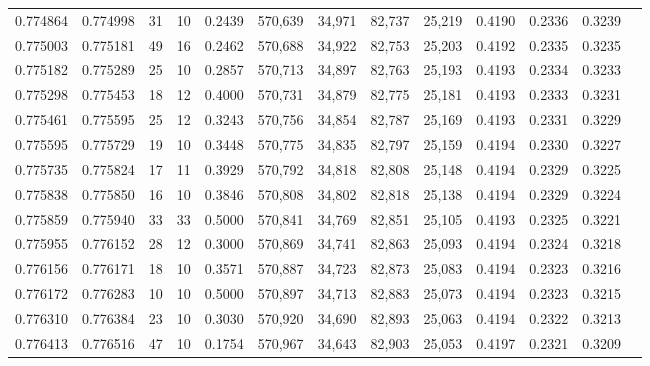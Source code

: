 \begin{tabular}{rrrrrrrrrrrrr}
0.774864 & 0.774998 &    31 &  10 &                                     0.2439 & 570,639 &  34,971 &  82,737 &  25,219 & 0.4190 & 0.2336 & 0.3239 \\
0.775003 & 0.775181 &    49 &  16 &                                     0.2462 & 570,688 &  34,922 &  82,753 &  25,203 & 0.4192 & 0.2335 & 0.3235 \\
0.775182 & 0.775289 &    25 &  10 &                                     0.2857 & 570,713 &  34,897 &  82,763 &  25,193 & 0.4193 & 0.2334 & 0.3233 \\
0.775298 & 0.775453 &    18 &  12 &                                     0.4000 & 570,731 &  34,879 &  82,775 &  25,181 & 0.4193 & 0.2333 & 0.3231 \\
0.775461 & 0.775595 &    25 &  12 &                                     0.3243 & 570,756 &  34,854 &  82,787 &  25,169 & 0.4193 & 0.2331 & 0.3229 \\
0.775595 & 0.775729 &    19 &  10 &                                     0.3448 & 570,775 &  34,835 &  82,797 &  25,159 & 0.4194 & 0.2330 & 0.3227 \\
0.775735 & 0.775824 &    17 &  11 &                                     0.3929 & 570,792 &  34,818 &  82,808 &  25,148 & 0.4194 & 0.2329 & 0.3225 \\
0.775838 & 0.775850 &    16 &  10 &                                     0.3846 & 570,808 &  34,802 &  82,818 &  25,138 & 0.4194 & 0.2329 & 0.3224 \\
0.775859 & 0.775940 &    33 &  33 &                                     0.5000 & 570,841 &  34,769 &  82,851 &  25,105 & 0.4193 & 0.2325 & 0.3221 \\
0.775955 & 0.776152 &    28 &  12 &                                     0.3000 & 570,869 &  34,741 &  82,863 &  25,093 & 0.4194 & 0.2324 & 0.3218 \\
0.776156 & 0.776171 &    18 &  10 &                                     0.3571 & 570,887 &  34,723 &  82,873 &  25,083 & 0.4194 & 0.2323 & 0.3216 \\
0.776172 & 0.776283 &    10 &  10 &                                     0.5000 & 570,897 &  34,713 &  82,883 &  25,073 & 0.4194 & 0.2323 & 0.3215 \\
0.776310 & 0.776384 &    23 &  10 &                                     0.3030 & 570,920 &  34,690 &  82,893 &  25,063 & 0.4194 & 0.2322 & 0.3213 \\
0.776413 & 0.776516 &    47 &  10 &                                     0.1754 & 570,967 &  34,643 &  82,903 &  25,053 & 0.4197 & 0.2321 & 0.3209 \\

\end{tabular}
